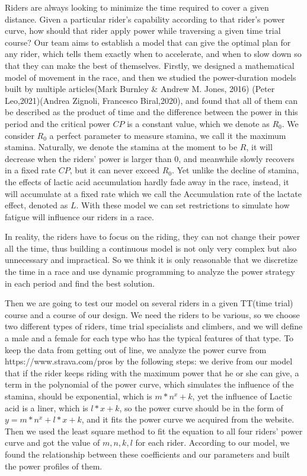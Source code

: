 \documentclass[12pt]{article}
\begin{document}
Riders are always looking to minimize the time required to cover a given distance. Given a
particular rider's capability according to that rider's power curve, how should that rider apply
power while traversing a given time trial course?
Our team aims to establish a model that can give the optimal plan for any  rider, which tells them exactly when to accelerate,
and when to slow down so that they can make the best of themselves. Firstly, we designed a mathematical model of movement in the race, and then we studied the power-duration models built by multiple articles(Mark Burnley \& Andrew M. Jones, 2016)\cite{doi:10.1080/17461391.2016.1249524}
(Peter Leo,2021)\cite{leo2021power}(Andrea Zignoli, Francesco Biral,2020)\cite{zignoli2020prediction}, and found that all of them can be described as the product of time and the difference
between the power in this period and the critical power $CP$ is a constant value, which we denote as $R_0$. We consider $R_0$ a perfect parameter to measure stamina, we call
it the maximum stamina. Naturally, we denote the stamina at the moment to be $R$, it
will decrease when the riders' power is larger than 0, and meanwhile slowly recovers in a fixed rate $CP$,
but it can never exceed $R_0$. Yet unlike the decline of stamina, the effects of lactic acid accumulation hardly fade away in the race, instead,
it will accumulate at a fixed rate which we call the Accumulation rate of the lactate effect, denoted as $L$. With these model we can set restrictions
to simulate how fatigue will influence our riders in a race.

In reality, the riders have to focus on the riding, they can not change their power all the time, thus building a continuous model is not only very complex but also unnecessary and impractical.
So we think it is only reasonable that we discretize the time in a race and use dynamic programming to analyze the power strategy in each period and find the best solution. 

Then we are going to test our model on several riders in a given TT(time trial) course and a course of our design. We need the riders to be various, so we choose two different types of riders, time trial
specialists and climbers, and we will define a male and a female for each type who has the typical features of that type.
To keep the data from getting out of line, we analyze the power curve
from https://www.strava.com/pros by the following steps:
we derive from our model that if the rider keeps riding with the maximum power that he or she can give, a term in the polynomial of the power curve,  which simulates the influence of the stamina, should be exponential,
which is $m*n^x+k$, yet the influence of Lactic acid is a liner, which is $l*x+k$, so the power curve should be in the form of $y=m*n^x+l*x+k$,
and it fits the power curve we acquired from the website.
Then we used the least square method to fit the equation to all four riders' power curve and  %
got the value of $m,n,k,l$ for each rider. According to our model, we found the relationship between these
coefficients and our parameters and built the power profiles of them.
\end{document}
